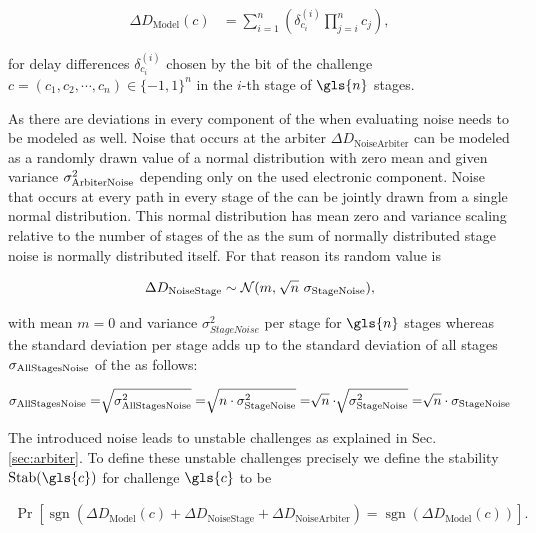 \begin{align}
\Delta D_{\mathrm{Model}}(c) &= \sum_{i=1}^{n}\left(\delta_{c_{i}}^{(i)}\prod_{j=i}^{n}c_{j}\right), \label{equ:pufmodelc}
\end{align}

for delay differences $\delta_{c_{i}}^{(i)}$ chosen by the bit of the challenge $c = (c_1, c_2, \cdots, c_n) \in \{-1, 1\}^n$ in the $i$-th stage of $\gls{n}$ stages.

As there are deviations in every component of the \puf when evaluating noise needs to be modeled as well.
Noise that occurs at the arbiter $\Delta D_{\mathrm{Noise Arbiter}}$ can be modeled as a randomly drawn value of a normal distribution with zero mean and given variance $\sigma_{\mathrm{Arbiter Noise}}^2$ depending only on the used electronic component.
Noise that occurs at every path in every stage of the \apuf can be jointly drawn from a single normal distribution.
This normal distribution has mean zero and variance scaling relative to the number of stages of the \apuf as the sum of normally distributed stage noise is normally distributed itself.
For that reason its random value is 

\begin{align}
\Delta D_{\mathrm{Noise Stage}} \sim \mathcal{N} (m,\ \sqrt[]{n}\ \sigmaSNoise), \label{equ:stagenoisedistribution}
\end{align}

with mean $m = 0$ and variance $\sigma_{Stage Noise}^2$ per stage for $\gls{n}$ stages whereas the standard deviation per stage adds up to the standard deviation of all stages $\sigma_{\mathrm{All Stages Noise}}$ of the \puf as follows:

\begin{align*}
\sigma_{\mathrm{All Stages Noise}} = \sqrt[]{\sigma_{\mathrm{All Stages Noise}}^2} = \sqrt[]{n \cdot \sigma_{\mathrm{Stage Noise}}^2} = \sqrt[]{n} \cdot \sqrt[]{\sigma_{\mathrm{Stage Noise}}^2} = \sqrt[]{n} \cdot \sigma_{\mathrm{Stage Noise}}
\end{align*}

The introduced noise leads to unstable challenges as explained in Sec. \ref{sec:arbiter}.
To define these unstable challenges precisely we define the stability $\Stab(\gls{c})$ for challenge $\gls{c}$ to be

\begin{align}
\Pr[\operatorname{sgn}(\Delta D_{\mathrm{Model}}(c) + \Delta D_{\mathrm{Noise Stage}} + \Delta D_{\mathrm{Noise Arbiter}}) = \operatorname{sgn}(\Delta D_{\mathrm{Model}}(c))]. \label{equ:stability}
\end{align}

